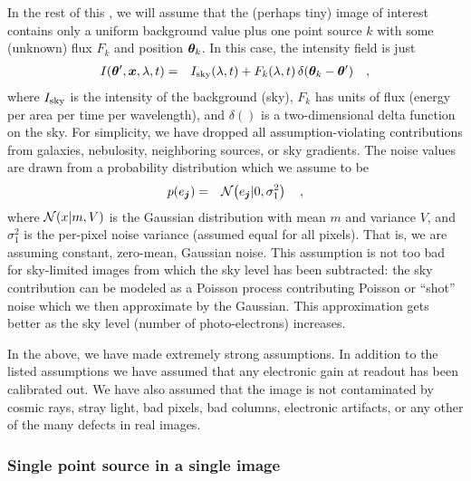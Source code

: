 In %
the rest of this \doctype, we will assume that the (perhaps tiny) image of
interest contains only a uniform background value plus one point
source $k$ with some (unknown) flux $F_k$ and position $\boldsymbol{\theta}_k$.
In this case, the intensity field is just
\begin{eqnarray}\displaystyle
I(\boldsymbol{\theta}',\boldsymbol{x},\lambda,t) &=& I_{\mathrm{sky}}(\lambda, t) + F_k(\lambda, t)\,\delta(\boldsymbol{\theta}_k - \boldsymbol{\theta}')
\quad,
\label{eqn:intensity}
\end{eqnarray}
where $I_{\mathrm{sky}}$ is the intensity of the background (sky), $F_k$ has
units of flux (energy per area per time per wavelength), and
$\delta()$ is a two-dimensional delta function on the sky.  For
simplicity, we have dropped all assumption-violating contributions
from galaxies, nebulosity, neighboring sources, or sky gradients.  The
noise values are drawn from a probability distribution which we assume
to be
\begin{eqnarray}\displaystyle
p(e_{\boldsymbol{j}}) &=& \mathcal{N}\!\left(e_{\boldsymbol{j}}|0,\sigma_1^2\right)
\quad,
\end{eqnarray}
where $\mathcal{N}\!\left(x|m,V\right)$ is the Gaussian distribution with mean $m$
and variance $V$, and $\sigma_1^2$ is the per-pixel noise variance
(assumed equal for all pixels).  That is, we are assuming constant,
zero-mean, Gaussian noise.  This assumption is not too bad for
sky-limited images from which the sky level has been subtracted: the
sky contribution can be modeled as a Poisson process contributing
Poisson or ``shot'' noise which we then approximate by the Gaussian.
This approximation gets better as the sky level (number of
photo-electrons) increases.

In the above, we have made extremely strong assumptions.  In addition
to the listed assumptions we have assumed that any electronic gain at
readout has been calibrated out.  We have also assumed that the image
is not contaminated by cosmic rays, stray light, bad pixels, bad
columns, electronic artifacts, or any other of the many defects in
real images.


\subsubsection{Single point source in a single image}

